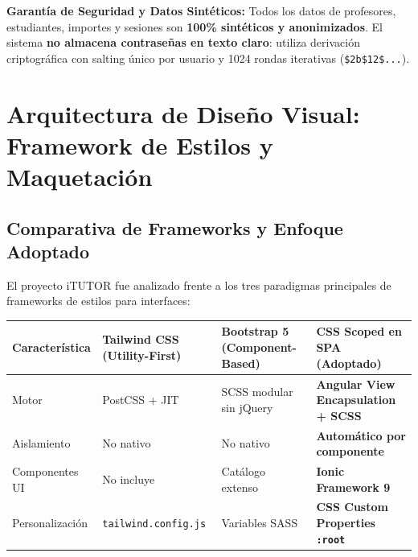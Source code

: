 \documentclass[11pt,a4paper]{article}
\begin{document}
\begin{alertSecurity}
\textbf{Garantía de Seguridad y Datos Sintéticos:} Todos los datos de profesores, estudiantes, importes y sesiones son \textbf{100\% sintéticos y anonimizados}. El sistema \textbf{no almacena contraseñas en texto claro}: utiliza derivación criptográfica con salting único por usuario y 1024 rondas iterativas (\texttt{\$2b\$12\$...}).
\end{alertSecurity}

\vspace{0.4cm}

\section{Arquitectura de Diseño Visual: Framework de Estilos y Maquetación}
\label{sec:diseno}

\subsection{Comparativa de Frameworks y Enfoque Adoptado}

El proyecto iTUTOR fue analizado frente a los tres paradigmas principales de frameworks de estilos para interfaces:

\begin{center}
\small
\begin{tabularx}{\textwidth}{p{2.5cm} X X X}
\toprule
\textbf{Característica} & \textbf{Tailwind CSS (Utility-First)} & \textbf{Bootstrap 5 (Component-Based)} & \textbf{CSS Scoped en SPA (Adoptado)} \\
\midrule
Motor & PostCSS + JIT & SCSS modular sin jQuery & \textbf{Angular View Encapsulation + SCSS} \\
Aislamiento & No nativo & No nativo & \textbf{Automático por componente} \\
Componentes UI & No incluye & Catálogo extenso & \textbf{Ionic Framework 9} \\
Personalización & \texttt{tailwind.config.js} & Variables SASS & \textbf{CSS Custom Properties \texttt{:root}} \\
\bottomrule
\end{tabularx}
\end{center}
\end{document}
